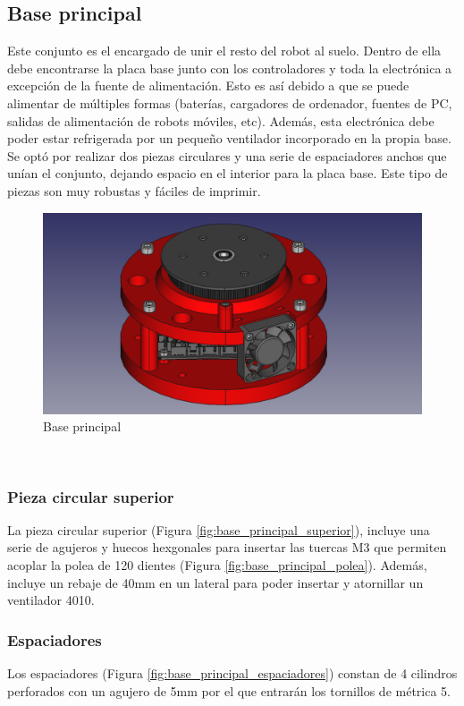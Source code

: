 \subsection{Base principal}
Este conjunto es el encargado de unir el resto del robot al suelo. Dentro de ella debe encontrarse la placa base junto con los controladores 
y toda la electrónica a excepción de la fuente de alimentación. Esto es así debido a que se puede alimentar de múltiples formas (baterías, 
cargadores de ordenador, fuentes de PC, salidas de alimentación de robots móviles, etc). Además, esta electrónica debe poder estar refrigerada 
por un pequeño ventilador incorporado en la propia base. \\
Se optó por realizar dos piezas circulares y una serie de espaciadores anchos que unían el conjunto, dejando espacio en el interior para 
la placa base. Este tipo de piezas son muy robustas y fáciles de imprimir. 
\begin{figure} [ht!]
  \begin{center}
    \includegraphics[width=12cm]{figs/base_principal.png}
  \end{center}
  \caption{Base principal}
\end{figure}\ 

\subsubsection{Pieza circular superior}
La pieza circular superior (Figura \ref{fig:base_principal_superior}), incluye una serie de agujeros y huecos hexgonales para insertar las tuercas M3 que permiten
acoplar la polea de 120 dientes (Figura \ref{fig:base_principal_polea}). Además, incluye un rebaje de 40mm en un lateral para poder insertar y atornillar un ventilador 4010.
\subsubsection{Espaciadores}
Los espaciadores (Figura \ref{fig:base_principal_espaciadores}) constan de 4 cilindros perforados con un agujero de 5mm por el que entrarán los tornillos de métrica 5.
